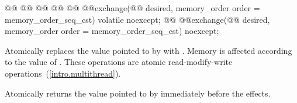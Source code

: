 %
%
%
%
%
\begin{itemdecl}
@@
@@
@@
@@
@@ @@exchange(@@ desired, memory_order order = memory_order_seq_cst) volatile noexcept;
@@ @@exchange(@@ desired, memory_order order = memory_order_seq_cst) noexcept;
\end{itemdecl}

\begin{itemdescr}
\pnum
\effects Atomically replaces the value pointed to  by 
with .
Memory is affected according to the value of .
These operations are atomic read-modify-write operations~(\ref{intro.multithread}).

\pnum
\returns Atomically returns the value pointed to  by  immediately before the effects.
\end{itemdescr}

